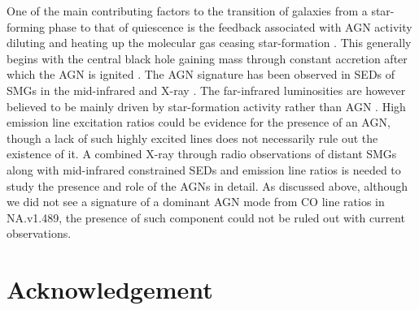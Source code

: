 \documentclass[iop,apj,useAMS,usenatbib]{emulateapj-rtx4}
\begin{document}
One of the main contributing factors to the transition of galaxies
from a star-forming phase to that of quiescence is the feedback
associated with AGN activity \citep{Sijacki2007, Feruglio2010, Cicone2014} diluting and heating up the
molecular gas ceasing star-formation \citep{Scannapieco2005}. This generally begins with the
central black hole gaining mass through constant accretion after which
the AGN is ignited \citep{Hopkins2016}. The AGN signature has been observed
in SEDs of SMGs in the mid-infrared
and X-ray \citep{Alexander2005, Valiante2007, Laird2010}. The
far-infrared luminosities are however believed to be
mainly driven by star-formation activity rather than AGN
\citep{Magnelli2012}. High emission line excitation ratios could be evidence for the
presence of an AGN, though a lack of such highly excited lines does not
necessarily rule out the existence of it. A combined X-ray through
radio observations of distant SMGs along with mid-infrared
constrained SEDs and emission line ratios is needed to study the
presence and role of the AGNs in detail. As
discussed above, although we did not see a signature of a dominant
AGN mode from CO line ratios in NA.v1.489, the presence of such
component could not be ruled out with current observations.

\section*{Acknowledgement} 
\end{document}
